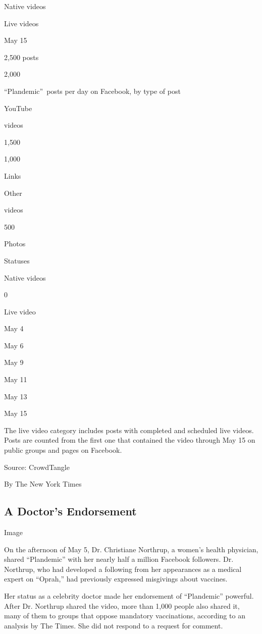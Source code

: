 Native videos

Live videos

May 15

2,500 posts

2,000

``Plandemic''~posts per day on Facebook, by type of post

YouTube

videos

1,500

1,000

Links

Other

videos

500

Photos

Statuses

Native videos

0

Live video

May 4

May 6

May 9

May 11

May 13

May 15

The live video category includes posts with completed and scheduled live
videos. Posts are counted from the first one that contained the video
through May 15 on public groups and pages on Facebook.

Source: CrowdTangle

By The New York Times

\hypertarget{a-doctors-endorsement}{%
\subsection{A Doctor's Endorsement}\label{a-doctors-endorsement}}

Image

On the afternoon of May 5, Dr. Christiane Northrup, a women's health
physician, shared ``Plandemic'' with her nearly half a million Facebook
followers. Dr. Northrup, who had developed a following from her
appearances as a medical expert on ``Oprah,'' had previously expressed
misgivings about vaccines.

Her status as a celebrity doctor made her endorsement of ``Plandemic''
powerful. After Dr. Northrup shared the video, more than 1,000 people
also shared it, many of them to groups that oppose mandatory
vaccinations, according to an analysis by The Times. She did not respond
to a request for comment.

